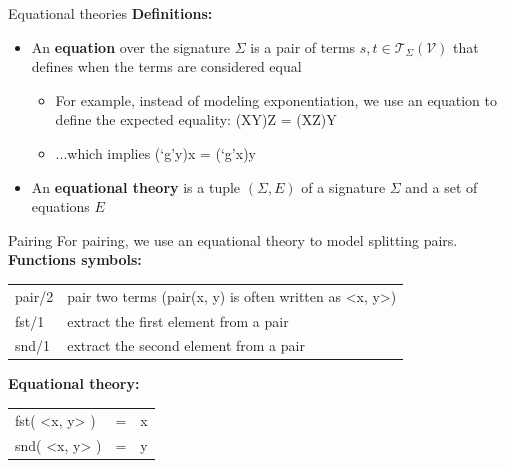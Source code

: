 \documentclass[11pt,aspectratio=169]{beamer}
\begin{document}
\begin{frame}[fragile]{Equational theories}
    \textbf{Definitions:}
    \begin{itemize}
        \item An \textbf{equation} over the signature $\Sigma$ is a pair of 
              terms $s,t \in \mathcal{T}_{\Sigma}(\mathcal{V})$ that defines 
              when the terms are considered equal
        \begin{itemize}
            \item For example, instead of modeling exponentiation, we use an 
                  equation to define the expected equality:
                  \textcolor{TermBlue}{(X\pow{}Y)\pow{}Z = (X\pow{}Z)\pow{}Y}
            \item ...which implies \textcolor{TermBlue}{
                  (`g'\pow{}y)\pow{}x = (`g'\pow{}x)\pow{}y}
        \end{itemize}
        \item An \textbf{equational theory} is a tuple $(\Sigma, E)$ of a 
              signature $\Sigma$ and a set of equations $E$
    \end{itemize}
\end{frame}

\begin{frame}[fragile]{Pairing}
    For pairing, we use an equational theory to model splitting pairs.\\[.3cm]

    \textbf{Functions symbols:}
    \begin{table}[]
        \raggedright
        \begin{tabular}{ll}
            \textcolor{TermBlue}{pair/2}
            & pair two terms
                (\textcolor{TermBlue}{pair(x, y)} is often written as
                \textcolor{TermBlue}{<x, y>}) \\
            \textcolor{TermBlue}{fst/1}
            & extract the first element from a pair \\
            \textcolor{TermBlue}{snd/1}
            & extract the second element from a pair
        \end{tabular}
    \end{table}

    \textbf{Equational theory:}
    \begin{table}[]
        \raggedright
        {\color{TermBlue}
        \begin{tabular}{lll}
            fst( <x, y> ) & = & x \\
            snd( <x, y> ) & = & y
        \end{tabular}}
    \end{table}
\end{frame}
\end{document}
